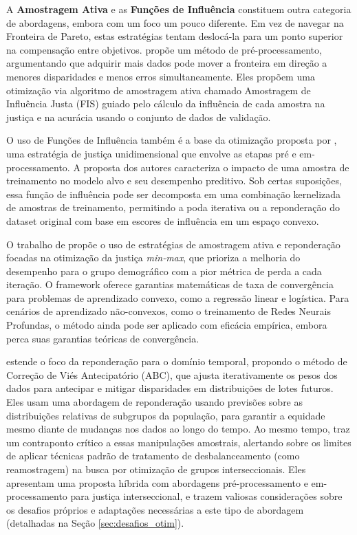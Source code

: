 A \textbf{Amostragem Ativa} e as \textbf{Funções de Influência} constituem outra categoria de abordagens, embora com um foco um pouco diferente. Em vez de navegar na Fronteira de Pareto, estas estratégias tentam deslocá-la para um ponto superior na compensação entre objetivos.
\citet{pang2024fairness} propõe um método de pré-processamento, argumentando que adquirir mais dados pode mover a fronteira em direção a menores disparidades e menos erros simultaneamente. Eles propõem uma otimização via algoritmo de amostragem ativa chamado Amostragem de Influência Justa (FIS) guiado pelo cálculo da influência de cada amostra na justiça e na acurácia  usando o conjunto de dados de validação.

O uso de Funções de Influência também é a base da otimização proposta por \citet{wang2022understanding}, uma estratégia de justiça unidimensional que envolve as etapas pré e em-processamento. A proposta dos autores caracteriza o impacto de uma amostra de treinamento no modelo alvo e seu desempenho preditivo.
Sob certas suposições, essa função de influência pode ser decomposta em uma combinação kernelizada de amostras de treinamento,
permitindo a poda iterativa ou a reponderação do dataset original com base em escores de influência em um espaço convexo.

O trabalho de \citet{abernethy2020active} propõe o uso de estratégias de amostragem ativa e reponderação focadas na otimização da justiça \textit{min-max}, que prioriza a melhoria do desempenho para o grupo demográfico com a pior métrica de perda a cada iteração. O framework oferece garantias matemáticas de taxa de convergência para problemas de aprendizado convexo, como a regressão linear e logística. Para cenários de aprendizado não-convexos, como o treinamento de Redes Neurais Profundas, o método ainda pode ser aplicado com eficácia empírica, embora perca suas garantias teóricas de convergência.

\citet{almuzaini2022abcinml} estende o foco da reponderação para o domínio temporal, propondo o método de Correção de Viés Antecipatório (ABC), que ajusta iterativamente os pesos dos dados para antecipar e mitigar disparidades em distribuições de lotes futuros. Eles usam uma abordagem de reponderação usando previsões sobre as distribuições relativas de subgrupos da população, para garantir a equidade mesmo diante de mudanças nos dados ao longo do tempo. Ao mesmo tempo, \citet{wang2022towards} traz um contraponto crítico a essas manipulações amostrais, alertando sobre os limites de aplicar técnicas padrão de tratamento de desbalanceamento (como reamostragem) na busca por otimização de grupos interseccionais. Eles apresentam uma proposta híbrida com abordagens pré-processamento e em-processamento para justiça interseccional, e trazem valiosas considerações sobre os desafios próprios e adaptações necessárias a este tipo de abordagem (detalhadas na Seção \ref{sec:desafios_otim}).

